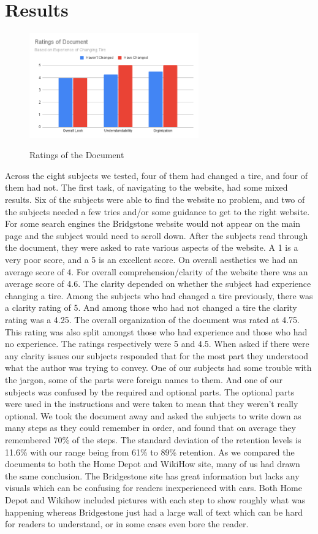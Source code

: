 \documentclass[12pt,A4paper]{article}
\begin{document}
	\section{Results}
	\begin{figure}[!h]
		\centering
		\includegraphics[width=0.65\textwidth]{Ratings_of_Document.png}
		\label{fig:f2}
		\caption{Ratings of the Document}
	\end{figure}
	Across the eight subjects we tested, four of them had changed a tire, and four of them had not. The first task, of navigating to the website, had some mixed results. Six of the subjects were able to find the website no problem, and two of the subjects needed a few tries and/or some guidance to get to the right website. For some search engines the Bridgstone website would not appear on the main page and the subject would need to scroll down. After the subjects read through the document, they were asked to rate various aspects of the website. A 1 is a very poor score, and a 5 is an excellent score. On overall aesthetics we had an average score of 4. For overall comprehension/clarity of the website there was an average score of 4.6. The clarity depended on whether the subject had experience changing a tire. Among the subjects who had changed a tire previously, there was a clarity rating of 5. And among those who had not changed a tire the clarity rating was a 4.25. The overall organization of the document was rated at 4.75. This rating was also split amongst those who had experience and those who had no experience. The ratings respectively were 5 and 4.5. When asked if there were any clarity issues our subjects responded that for the most part they understood what the author was trying to convey. One of our subjects had some trouble with the jargon, some of the parts were foreign names to them. And one of our subjects was confused by the required and optional parts. The optional parts were used in the instructions and were taken to mean that they weren’t really optional. We took the document away and asked the subjects to write down as many steps as they could remember in order, and found that on average they remembered 70\% of the steps. The standard deviation of the retention levels is 11.6\% with our range being from 61\% to 89\% retention. As we compared the documents to both the Home Depot and WikiHow site, many of us had drawn the same conclusion. The Bridgestone site has great information but lacks any visuals which can be confusing for readers inexperienced with cars. Both Home Depot and Wikihow included pictures with each step to show roughly what was happening whereas Bridgestone just had a large wall of text which can be hard for readers to understand, or in some cases even bore the reader.
\end{document}
